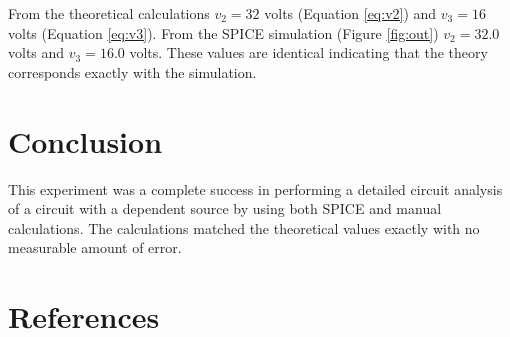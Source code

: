 \documentclass{article}
\begin{document}
From the theoretical calculations $v_2 = 32$ volts (Equation \ref{eq:v2})
and $v_3 = 16$ volts (Equation \ref{eq:v3}).
From the SPICE simulation (Figure \ref{fig:out}) $v_2 = 32.0$ volts and
$v_3 = 16.0$ volts.
These values are identical indicating that the theory corresponds
exactly with the simulation.


\section{Conclusion}

This experiment was a complete success in performing a detailed
circuit analysis of a circuit with a dependent source by using
both SPICE and manual calculations.
The calculations matched the theoretical values exactly
with no measurable amount of error.


\clearpage

\pagebreak
\renewcommand*{\refname}{\vspace{-8mm}}
\section{References}


\end{document}
